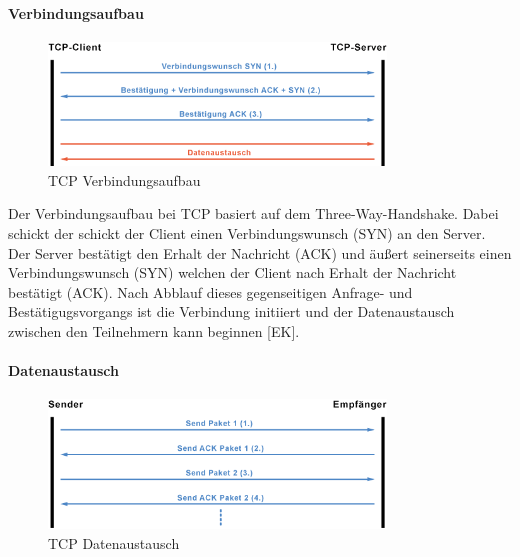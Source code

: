 \paragraph{Verbindungsaufbau} \code{}
\newline
\smallskip
\begin{figure}[ht]
	\centering
	\includegraphics[width=0.8\textwidth]{images/Verbindungsaufbau.png}
	\caption[TCP Verbindungsaufbau]{TCP Verbindungsaufbau}
	\label{fig:<Sprungmakre>}
\end{figure}
Der Verbindungsaufbau bei TCP basiert auf dem Three-Way-Handshake. Dabei schickt der schickt der Client einen Verbindungswunsch (SYN) an den Server. Der Server bestätigt den Erhalt der Nachricht (ACK) und äußert seinerseits einen Verbindungswunsch (SYN) welchen der Client nach Erhalt der Nachricht bestätigt (ACK). Nach Abblauf dieses gegenseitigen Anfrage- und Bestätigugsvorgangs ist die Verbindung initiiert und der Datenaustausch zwischen den Teilnehmern kann beginnen [EK].
\paragraph{Datenaustausch}
\begin{figure}[ht]
	\centering
	\includegraphics[width=0.8\textwidth]{images/Datenaustausch.png}
	\caption[TCP Datenaustausch]{TCP Datenaustausch}
	\label{fig:<Sprungmakre>}
\end{figure}
